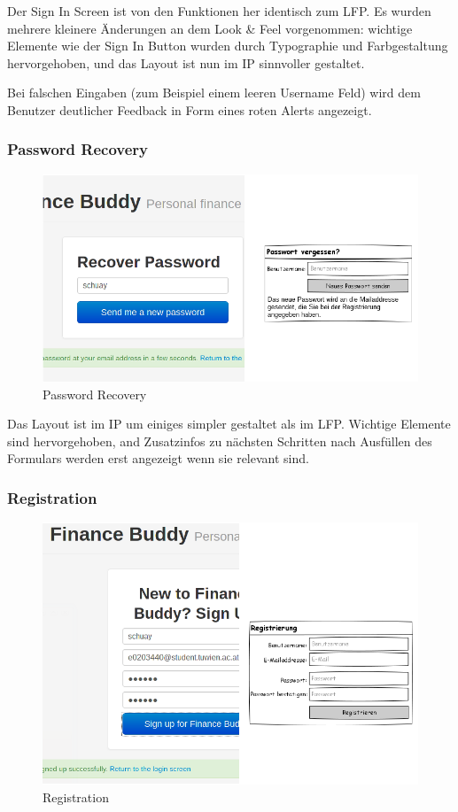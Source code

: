 \documentclass[a4paper,10pt]{article}
\begin{document}
Der Sign In Screen ist von den Funktionen her identisch zum LFP. Es wurden mehrere
kleinere \"Anderungen an dem Look \& Feel vorgenommen: wichtige Elemente wie der
Sign In Button wurden durch Typographie und Farbgestaltung hervorgehoben, und das Layout
ist nun im IP sinnvoller gestaltet.

Bei falschen Eingaben (zum Beispiel einem leeren Username Feld) wird dem Benutzer
deutlicher Feedback in Form eines roten Alerts angezeigt.

\clearpage
\subsubsection{Password Recovery}

\begin{figure}
\centering
\includegraphics[width=\textwidth]{password-recovery}
\caption{Password Recovery} \label{fig:password-recovery}
\end{figure}

Das Layout ist im IP um einiges simpler gestaltet als im LFP. Wichtige Elemente
sind hervorgehoben, and Zusatzinfos zu n\"achsten Schritten nach Ausf\"ullen
des Formulars werden erst angezeigt wenn sie relevant sind.

\clearpage
\subsubsection{Registration}

\begin{figure}
\centering
\includegraphics[width=\textwidth]{registration}
\caption{Registration} \label{fig:registration}
\end{figure}
\end{document}
